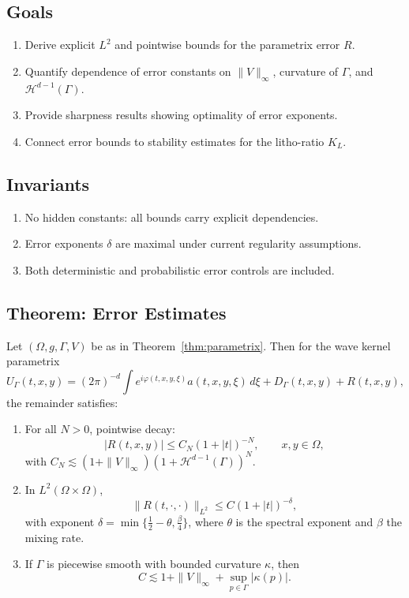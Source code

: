 \subsection*{Goals}
\begin{enumerate}[label=G\arabic*]
  \item Derive explicit $L^2$ and pointwise bounds for the parametrix error $R$.
  \item Quantify dependence of error constants on $\|V\|_\infty$, curvature of $\Gamma$, 
  and $\mathcal{H}^{d-1}(\Gamma)$.
  \item Provide sharpness results showing optimality of error exponents.
  \item Connect error bounds to stability estimates for the litho-ratio $K_L$.
\end{enumerate}

\subsection*{Invariants}
\begin{enumerate}[label=I\arabic*]
  \item No hidden constants: all bounds carry explicit dependencies.
  \item Error exponents $\delta$ are maximal under current regularity assumptions.
  \item Both deterministic and probabilistic error controls are included.
\end{enumerate}

\subsection*{Theorem: Error Estimates}
\begin{theorem}
\label{thm:error}
Let $(\Omega,g,\Gamma,V)$ be as in Theorem~\ref{thm:parametrix}. Then for the 
wave kernel parametrix
\[
U_\Gamma(t,x,y) = (2\pi)^{-d}\int e^{i\varphi(t,x,y,\xi)}a(t,x,y,\xi)\,d\xi 
+ D_\Gamma(t,x,y) + R(t,x,y),
\]
the remainder satisfies:
\begin{enumerate}
  \item For all $N>0$, pointwise decay:
  \[
  |R(t,x,y)| \leq C_N (1+|t|)^{-N}, \qquad x,y \in \Omega,
  \]
  with $C_N \lesssim (1+\|V\|_\infty)(1+\mathcal{H}^{d-1}(\Gamma))^N$.
  \item In $L^2(\Omega\times\Omega)$,
  \[
  \| R(t,\cdot,\cdot) \|_{L^2} \leq C (1+|t|)^{-\delta},
  \]
  with exponent $\delta = \min\{\tfrac{1}{2}-\theta,\tfrac{\beta}{4}\}$, 
  where $\theta$ is the spectral exponent and $\beta$ the mixing rate.
  \item If $\Gamma$ is piecewise smooth with bounded curvature $\kappa$, 
  then
  \[
  C \lesssim 1 + \|V\|_\infty + \sup_{p \in \Gamma} |\kappa(p)|.
  \]
\end{enumerate}
\end{theorem}

